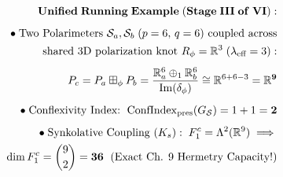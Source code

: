\documentclass[preview]{standalone}
\begin{document}
\begin{align*}
\special{dvisvgm:raw <g id='unique000'>}\mathbf{Unified\;Running\;Example\;(Stage\;III\;of\;VI):}\\[5pt]\bullet\;\text{Two Polarimeters }\mathcal{S}_a,\mathcal{S}_b\;(p=6,\, q=6)\text{ coupled across}\\\;\;\text{shared 3D polarization knot }R_\phi = \mathbb{R}^3\;(\lambda_{\text{eff}}=3):\\[4pt]P_c = P_a \boxplus_\phi P_b = \frac{\mathbb{R}^6_a \oplus_1 \mathbb{R}^6_b}{\operatorname{Im}(\delta_\phi)} \cong \mathbb{R}^{6+6-3} = \mathbf{\mathbb{R}^9}\\[5pt]\bullet\;\text{Conflexivity Index: }\operatorname{ConfIndex}_{\text{pres}}(G_{\mathcal{S}}) = 1 + 1 = \mathbf{2}\\[4pt]\bullet\;\text{Synkolative Coupling }(K_s):\; F_1^c = \Lambda^2(\mathbb{R}^9)\implies\\\dim F_1^c = \binom{9}{2} = \mathbf{36}\;\text{ (Exact Ch. 9 Hermetry Capacity!)}\special{dvisvgm:raw </g>}
\end{align*}
\end{document}
